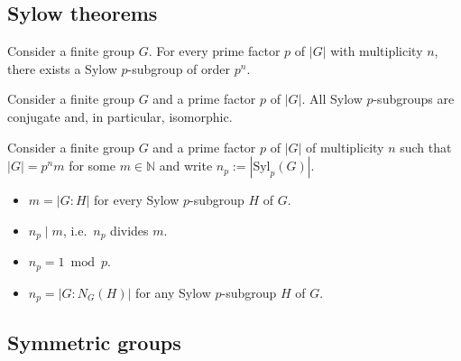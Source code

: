 \subsection{Sylow theorems}


    \begin{theorem}[Sylow I]
        Consider a finite group $G$. For every prime factor $p$ of $|G|$ with multiplicity $n$, there exists a Sylow $p$-subgroup of order $p^n$.
    \end{theorem}
    \begin{theorem}[Sylow II]
        Consider a finite group $G$ and a prime factor $p$ of $|G|$. All Sylow $p$-subgroups are conjugate and, in particular, isomorphic.
    \end{theorem}
    \begin{theorem}
        Consider a finite group $G$ and a prime factor $p$ of $|G|$ of multiplicity $n$ such that $|G|=p^nm$ for some $m\in\mathbb{N}$ and write $n_p:=|\mathrm{Syl}_p(G)|$.
        \begin{itemize}
            \item $m=|G:H|$ for every Sylow $p$-subgroup $H$ of $G$.
            \item $n_p\mid m$, i.e.~$n_p$ divides $m$.
            \item $n_p=1\bmod p$.
            \item $n_p=|G:N_G(H)|$ for any Sylow $p$-subgroup $H$ of $G$.
        \end{itemize}
    \end{theorem}

\subsection{Symmetric groups}

